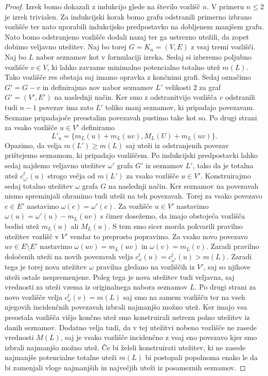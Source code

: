 \documentclass[12pt,a4paper,twoside]{article}
\theoremstyle{definition} %
\theoremstyle{plain} %
\numberwithin{equation}{section}  %
\begin{document}
\begin{proof}
Izrek bomo dokazali z indukcijo glede na število vozlišč $n$. V primeru $n \le 2$ je izrek trivialen. Za indukcijski korak bomo grafu odstranili primerno izbrano vozlišče ter nato uporabili indukcijsko predpostavko na dobljenem manjšem grafu. Nato bomo odstranjeno vozlišče dodali nazaj ter ga ustrezno utežili, da zopet dobimo veljavno utežitev. Naj bo torej $G = K_n = (V, E)$ z vsaj tremi vozlišči. Naj bo $L$ nabor seznamov kot v formulaciji izreka. Sedaj si izberemo poljubno vozlišče $v \in V$, ki lahko zavzame minimalno potencialno totalno utež $m(L)$. Tako vozlišče res obstaja saj imamo opravka z končnimi grafi. Sedaj označimo $G' = G - v$ in definirajmo nov nabor seznamov $L'$ velikosti $2$ za graf $G' = (V', E')$ na naslednji način. Ker smo z odstranitvijo vozlišča $v$ odstranili tudi $n-1$ povezav ima zato $L'$ toliko manj seznamov, ki pripadajo povezavam. Sezname pripadajoče preostalim povezavah pustimo take kot so. Po drugi strani za vsako vozlišče $u \in V'$ definiramo 
$$L'_u = \{m_L(u) + m_L(uv), M_L(U) + m_L(uv) \}. $$
Opazimo, da velja $m(L') \ge m(L)$ saj uteži iz odstranjenih povezav prištejemo seznamom, ki pripadajo vozliščem. Po indukcijski predpostavki lahko sedaj najdemo veljavno utežitev $\omega'$ grafa $G'$ iz seznamov $L'$, tako da je totalna utež $c_{\omega'}^t(u)$ strogo večja od $m(L')$ za vsako vozlišče $u \in V'$. Konstruirajmo sedaj totalno utežitev $\omega$ grafa $G$ na naslednji način. Ker seznamov na povezavah nismo spreminjali ohranimo tudi uteži na teh povezavah. Torej za vsako povezavo $e \in E'$ nastavimo $\omega(e) = \omega'(e)$. Za vozlišče $u \in V'$ nastavimo $\omega(u) = \omega'(u) - m_L(uv)$ s čimer dosežemo, da imajo obstoječa vozlišča bodisi utež $m_L(u)$ ali $M_L(u)$. S tem smo sicer morda pokvarili pravilno utežitev vozlišč v $V'$ vendar to preprosto popravimo. Za vsako novo povezavo $uv \in E \setminus E'$ nastavimo $\omega(uv) = m_L(uv)$ in $\omega(v)= m_L(v)$. Zaradi pravilno določenih uteži na novih povezavah velja $c_{\omega}^t(u) =c_{\omega'}^t(u) > m(L)$. Zaradi tega je torej nova utežitev $\omega$ pravilna gledano na vozliščih iz $V'$, saj so njihove uteži ostale nespremenjene. Poleg tega je nova utežitev tudi veljavna, saj vrednosti za uteži vzema iz originalnega nabora seznamov $L$. Po drugi strani za novo vozlišče velja $c_{\omega}^t(v) = m(L)$ saj smo na samem vozlišču ter na vseh njegovih incidenčnih povezavah izbrali najmanjšo možno utež. Ker imajo vsa preostala vozlišča višjo končno utež smo konstruirali ustrezn polno utežitev iz danih seznamov. Dodatno velja tudi, da v tej utežitvi nobeno vozlišče ne zasede vrednosti $M(L)$, saj je vsako vozlišče incidenčno z vsaj eno povezavo kjer smo izbrali najmanjšo možno utež.
Če bi želeli konstruirati utežitev, ki ne zasede najmanjše potencialne totalne uteži $m(L)$ bi postopali popolnoma enako le da bi zamenjali vloge najmanjših in največjih uteži iz posameznih seznamov.
\end{proof}
\end{document}
